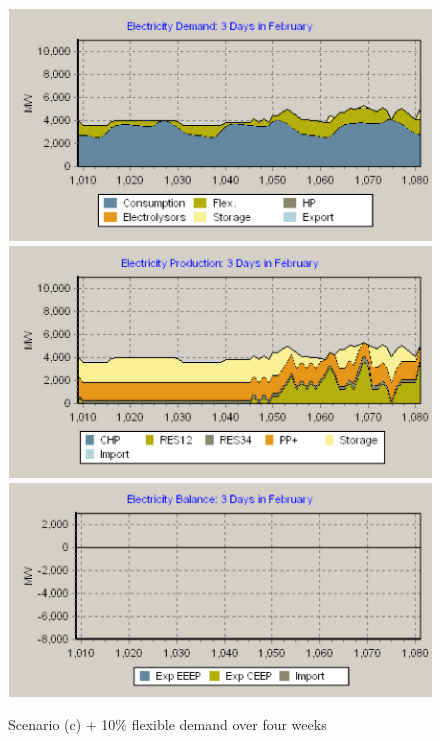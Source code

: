 \begin{appendices}
  \begin{figure}[htbp]
    \centering
    \centering
    \includegraphics[scale=1.4]{figures/B17-3day-demand.png}
    \includegraphics[scale=1.4]{figures/B17-3day-production.png}
    \includegraphics[scale=1.4]{figures/B17-3day-balance.png}
    \caption{Scenario (c) + 10\% flexible demand over four weeks}
    \label{app:B17}
  \end{figure}

\end{appendices}
